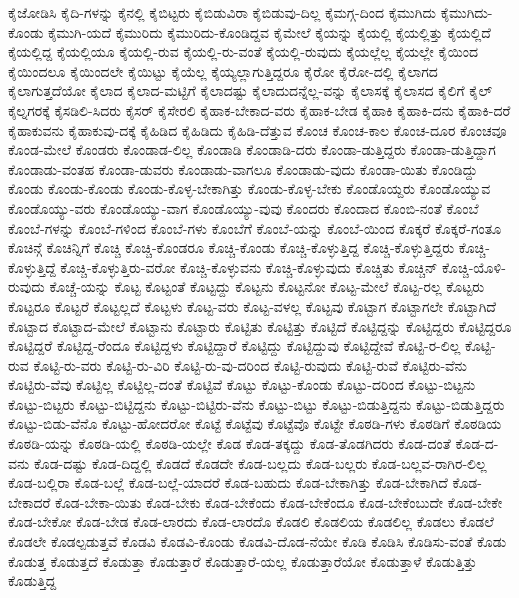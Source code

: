 {ಕೈಜೋಡಿಸಿ
ಕೈದಿ-ಗಳನ್ನು
ಕೈನಲ್ಲಿ
ಕೈಬಿಟ್ಟರು
ಕೈಬಿಡುವಿರಾ
ಕೈಬಿಡುವು-ದಿಲ್ಲ
ಕೈಮಗ್ಗ-ದಿಂದ
ಕೈಮುಗಿದು
ಕೈಮುಗಿದು-ಕೊಂಡು
ಕೈಮುಗಿ-ಯದೆ
ಕೈಮುರಿದು
ಕೈಮುರಿದು-ಕೊಂಡಿದ್ದವ
ಕೈಮೇಲೆ
ಕೈಯನ್ನು
ಕೈಯಲ್ಲಿ
ಕೈಯಲ್ಲಿತ್ತು
ಕೈಯಲ್ಲಿದೆ
ಕೈಯಲ್ಲಿದ್ದ
ಕೈಯಲ್ಲಿಯೂ
ಕೈಯಲ್ಲಿ-ರುವ
ಕೈಯಲ್ಲಿ-ರು-ವಂತೆ
ಕೈಯಲ್ಲಿ-ರುವುದು
ಕೈಯಲ್ಲೆಲ್ಲ
ಕೈಯಲ್ಲೇ
ಕೈಯಿಂದ
ಕೈಯಿಂದಲೂ
ಕೈಯಿಂದಲೇ
ಕೈಯಿಟ್ಟು
ಕೈಯೆಲ್ಲ
ಕೈಯ್ಯಲ್ಲಾಗುತ್ತಿದ್ದರೂ
ಕೈರೋ
ಕೈರೋ-ದಲ್ಲಿ
ಕೈಲಾಗದ
ಕೈಲಾಗುತ್ತದೆಯೋ
ಕೈಲಾದ
ಕೈಲಾದ-ಮಟ್ಟಿಗೆ
ಕೈಲಾದಷ್ಟು
ಕೈಲಾದುದನ್ನೆಲ್ಲ-ವನ್ನು
ಕೈಲಾಸಕ್ಕೆ
ಕೈಲಾಸದ
ಕೈಲಿಗೆ
ಕೈಲ್
ಕೈಲ್ನಗರಕ್ಕೆ
ಕೈಸಡಿಲಿ-ಸಿದರು
ಕೈಸರ್
ಕೈಸೇರಲಿ
ಕೈಹಾಕ-ಬೇಕಾದ-ವರು
ಕೈಹಾಕ-ಬೇಡ
ಕೈಹಾಕಿ
ಕೈಹಾಕಿ-ದನು
ಕೈಹಾಕಿ-ದರೆ
ಕೈಹಾಕುವನು
ಕೈಹಾಕುವು-ದಕ್ಕೆ
ಕೈಹಿಡಿದ
ಕೈಹಿಡಿದು
ಕೈಹಿಡಿ-ದೆತ್ತುವ
ಕೊಂಚ
ಕೊಂಚ-ಕಾಲ
ಕೊಂಚ-ದೂರ
ಕೊಂಚವೂ
ಕೊಂಡ-ಮೇಲೆ
ಕೊಂಡರು
ಕೊಂಡಾಡ-ಲಿಲ್ಲ
ಕೊಂಡಾಡಿ
ಕೊಂಡಾಡಿ-ದರು
ಕೊಂಡಾ-ಡುತ್ತಿದ್ದರು
ಕೊಂಡಾ-ಡುತ್ತಿದ್ದಾಗ
ಕೊಂಡಾಡು-ವಂತಹ
ಕೊಂಡಾ-ಡುವರು
ಕೊಂಡಾಡು-ವಾಗಲೂ
ಕೊಂಡಾಡು-ವುದು
ಕೊಂಡಾ-ಯಿತು
ಕೊಂಡಿದ್ದು
ಕೊಂಡು
ಕೊಂಡು-ಕೊಂಡು
ಕೊಂಡು-ಕೊಳ್ಳ-ಬೇಕಾಗಿತ್ತು
ಕೊಂಡು-ಕೊಳ್ಳ-ಬೇಕು
ಕೊಂಡೊಯ್ದರು
ಕೊಂಡೊಯ್ಯುವ
ಕೊಂಡೊಯ್ಯು-ವರು
ಕೊಂಡೊಯ್ಯು-ವಾಗ
ಕೊಂಡೊಯ್ಯು-ವುವು
ಕೊಂದರು
ಕೊಂದಾದ
ಕೊಂಬಿ-ನಂತೆ
ಕೊಂಬೆ
ಕೊಂಬೆ-ಗಳನ್ನು
ಕೊಂಬೆ-ಗಳಿಂದ
ಕೊಂಬೆ-ಗಳು
ಕೊಂಬೆಗೆ
ಕೊಂಬೆ-ಯನ್ನು
ಕೊಂಬೆ-ಯಿಂದ
ಕೊಕ್ಕರೆ
ಕೊಕ್ಕರೆ-ಗಂತೂ
ಕೊಚಿನ್ಗೆ
ಕೊಚಿನ್ನಿಗೆ
ಕೊಚ್ಚಿ
ಕೊಚ್ಚಿ-ಕೊಂಡರೂ
ಕೊಚ್ಚಿ-ಕೊಂಡು
ಕೊಚ್ಚಿ-ಕೊಳ್ಳುತ್ತಿದ್ದ
ಕೊಚ್ಚಿ-ಕೊಳ್ಳುತ್ತಿದ್ದರು
ಕೊಚ್ಚಿ-ಕೊಳ್ಳುತ್ತಿದ್ದೆ
ಕೊಚ್ಚಿ-ಕೊಳ್ಳುತ್ತಿರು-ವರೋ
ಕೊಚ್ಚಿ-ಕೊಳ್ಳುವನು
ಕೊಚ್ಚಿ-ಕೊಳ್ಳುವುದು
ಕೊಚ್ಚಿತು
ಕೊಚ್ಚಿನ್
ಕೊಚ್ಚಿ-ಯೊಳಿ-ರುವುದು
ಕೊಚ್ಚೆ-ಯನ್ನು
ಕೊಟ್ಟ
ಕೊಟ್ಟಂತೆ
ಕೊಟ್ಟದ್ದು
ಕೊಟ್ಟನು
ಕೊಟ್ಟನೋ
ಕೊಟ್ಟ-ಮೇಲೆ
ಕೊಟ್ಟ-ರಲ್ಲ
ಕೊಟ್ಟರು
ಕೊಟ್ಟರೂ
ಕೊಟ್ಟರೆ
ಕೊಟ್ಟಲ್ಲದೆ
ಕೊಟ್ಟಳು
ಕೊಟ್ಟ-ವರು
ಕೊಟ್ಟ-ವಳಲ್ಲ
ಕೊಟ್ಟವು
ಕೊಟ್ಟಾಗ
ಕೊಟ್ಟಾಗಲೇ
ಕೊಟ್ಟಾಗಿದೆ
ಕೊಟ್ಟಾದ
ಕೊಟ್ಟಾದ-ಮೇಲೆ
ಕೊಟ್ಟಾನು
ಕೊಟ್ಟಾರು
ಕೊಟ್ಟಿತು
ಕೊಟ್ಟಿತ್ತು
ಕೊಟ್ಟಿದೆ
ಕೊಟ್ಟಿದ್ದನ್ನು
ಕೊಟ್ಟಿದ್ದರು
ಕೊಟ್ಟಿದ್ದರೂ
ಕೊಟ್ಟಿದ್ದರೆ
ಕೊಟ್ಟಿದ್ದ-ರೆಂದೂ
ಕೊಟ್ಟಿದ್ದಳು
ಕೊಟ್ಟಿದ್ದಾರೆ
ಕೊಟ್ಟಿದ್ದು
ಕೊಟ್ಟಿದ್ದುವು
ಕೊಟ್ಟಿದ್ದೇವೆ
ಕೊಟ್ಟಿ-ರ-ಲಿಲ್ಲ
ಕೊಟ್ಟಿ-ರುವ
ಕೊಟ್ಟಿ-ರು-ವರು
ಕೊಟ್ಟಿ-ರು-ವಿರಿ
ಕೊಟ್ಟಿ-ರು-ವು-ದರಿಂದ
ಕೊಟ್ಟಿ-ರುವುದು
ಕೊಟ್ಟಿ-ರುವೆ
ಕೊಟ್ಟಿರು-ವೆನು
ಕೊಟ್ಟಿರು-ವೆವು
ಕೊಟ್ಟಿಲ್ಲ
ಕೊಟ್ಟಿಲ್ಲ-ದಂತೆ
ಕೊಟ್ಟಿವೆ
ಕೊಟ್ಟು
ಕೊಟ್ಟು-ಕೊಂಡು
ಕೊಟ್ಟು-ದರಿಂದ
ಕೊಟ್ಟು-ಬಿಟ್ಟನು
ಕೊಟ್ಟು-ಬಿಟ್ಟರು
ಕೊಟ್ಟು-ಬಿಟ್ಟಿದ್ದನು
ಕೊಟ್ಟು-ಬಿಟ್ಟಿರು-ವೆನು
ಕೊಟ್ಟು-ಬಿಟ್ಟು
ಕೊಟ್ಟು-ಬಿಡುತ್ತಿದ್ದನು
ಕೊಟ್ಟು-ಬಿಡುತ್ತಿದ್ದರು
ಕೊಟ್ಟು-ಬಿಡು-ವೆನೊ
ಕೊಟ್ಟು-ಹೋದರೋ
ಕೊಟ್ಟೆ
ಕೊಟ್ಟೆವು
ಕೊಟ್ಟೆವೊ
ಕೊಟ್ಟೇ
ಕೊಠಡಿ-ಗಳು
ಕೊಠಡಿಗೆ
ಕೊಠಡಿಯ
ಕೊಠಡಿ-ಯನ್ನು
ಕೊಠಡಿ-ಯಲ್ಲಿ
ಕೊಠಡಿ-ಯಲ್ಲೇ
ಕೊಡ
ಕೊಡ-ತಕ್ಕದ್ದು
ಕೊಡ-ತೊಡಗಿದರು
ಕೊಡ-ದಂತೆ
ಕೊಡ-ದ-ವನು
ಕೊಡ-ದಷ್ಟು
ಕೊಡ-ದಿದ್ದಲ್ಲಿ
ಕೊಡದೆ
ಕೊಡದೇ
ಕೊಡ-ಬಲ್ಲದು
ಕೊಡ-ಬಲ್ಲರು
ಕೊಡ-ಬಲ್ಲವ-ರಾಗಿರ-ಲಿಲ್ಲ
ಕೊಡ-ಬಲ್ಲಿರಾ
ಕೊಡ-ಬಲ್ಲೆ
ಕೊಡ-ಬಲ್ಲೆ-ಯಾದರೆ
ಕೊಡ-ಬಹುದು
ಕೊಡ-ಬೇಕಾಗಿತ್ತು
ಕೊಡ-ಬೇಕಾಗಿದೆ
ಕೊಡ-ಬೇಕಾದರೆ
ಕೊಡ-ಬೇಕಾ-ಯಿತು
ಕೊಡ-ಬೇಕು
ಕೊಡ-ಬೇಕೆಂದು
ಕೊಡ-ಬೇಕೆಂದೂ
ಕೊಡ-ಬೇಕೆಂಬುದೇ
ಕೊಡ-ಬೇಕೇ
ಕೊಡ-ಬೇಕೋ
ಕೊಡ-ಬೇಡ
ಕೊಡ-ಲಾರದು
ಕೊಡ-ಲಾರದೊ
ಕೊಡಲಿ
ಕೊಡಲಿಯ
ಕೊಡಲಿಲ್ಲ
ಕೊಡಲು
ಕೊಡಲೆ
ಕೊಡಲೇ
ಕೊಡಲ್ಪಡುತ್ತವೆ
ಕೊಡವಿ
ಕೊಡವಿ-ಕೊಂಡು
ಕೊಡವಿ-ದೊಡ-ನೆಯೇ
ಕೊಡಿ
ಕೊಡಿಸಿ
ಕೊಡಿಸು-ವಂತೆ
ಕೊಡು
ಕೊಡುತ್ತ
ಕೊಡುತ್ತದೆ
ಕೊಡುತ್ತಾ
ಕೊಡುತ್ತಾರೆ
ಕೊಡುತ್ತಾರೆ-ಯಲ್ಲ
ಕೊಡುತ್ತಾರೆಯೋ
ಕೊಡುತ್ತಾಳೆ
ಕೊಡುತ್ತಿತ್ತು
ಕೊಡುತ್ತಿದ್ದ
}
